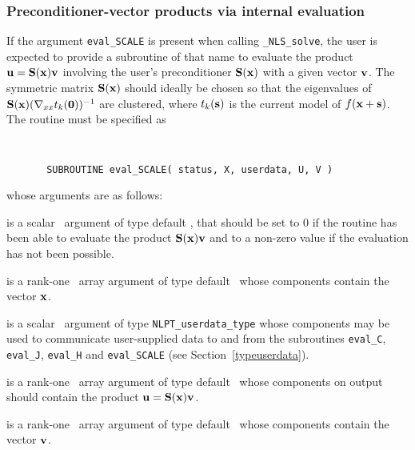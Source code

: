 \documentclass{galahad}
\newcommand{\packagename}{NLS}
\newcommand{\fullpackagename}{\libraryname\_\packagename}
\newcommand{\solver}{{\tt \fullpackagename\_solve}}
\begin{document}

\subsubsection{Preconditioner-vector products via internal evaluation\label{pv}}

If the argument {\tt eval\_SCALE} is present when calling \solver, the
user is expected to provide a subroutine of that name to evaluate the
product ${\mathbf{u}} = {\mathbf{S}}({\mathbf{x}}) {\mathbf{v}}$ involving the user's preconditioner
${\mathbf{S}}({\mathbf{x}})$ with a given vector ${\mathbf{v}}$. The symmetric matrix ${\mathbf{S}}({\mathbf{x}})$
should ideally be chosen so that the eigenvalues of
${\mathbf{S}}({\mathbf{x}}) (\nabla_{xx} t_k({\mathbf{0}}))^{-1}$ are clustered, where $t_k({\mathbf{s}})$
is the current model of $f({\mathbf{x}}+{\mathbf{s}})$.
The routine must be specified as

\def\baselinestretch{0.8}
{\tt
\begin{verbatim}
       SUBROUTINE eval_SCALE( status, X, userdata, U, V )
\end{verbatim} }
\def\baselinestretch{1.0}
\noindent whose arguments are as follows:

\begin{description}
 is a scalar \intentout\ argument of type default \integer,
that should be set to 0 if the routine has been able to evaluate the
product ${\mathbf{S}}({\mathbf{x}}) {\mathbf{v}}$
and to a non-zero value if the evaluation has not been possible.

 is a rank-one \intentin\ array argument of type default \realdp\
whose components contain the vector ${\mathbf{x}}$.

 is a scalar \intentinout\ argument of type
{\tt NLPT\_userdata\_type} whose components may be used
to communicate user-supplied data to and from the
subroutines {\tt eval\_C}, {\tt eval\_J},
{\tt eval\_H} and {\tt eval\_SCALE}
(see Section~\ref{typeuserdata}).

 is a rank-one \intentout\ array argument of type default \realdp\
whose components on output should contain the product ${\mathbf{u}} = {\mathbf{S}}({\mathbf{x}}) {\mathbf{v}}$.

\ittf{V} is a rank-one \intentin\ array argument of type default \realdp\
whose components contain the vector ${\mathbf{v}}$.

\end{description}

\end{document}
